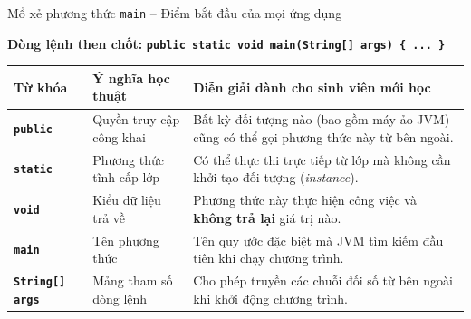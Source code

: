 \documentclass[aspectratio=169, 10pt]{beamer}
\begin{document}
\begin{frame}{Mổ xẻ phương thức \texttt{main} -- Điểm bắt đầu của mọi ứng dụng}
  \begin{block}{\textbf{Dòng lệnh then chốt:}}
    \centering
    \large\texttt{\textbf{\textcolor{JavaKeyword}{public static void} main(\textcolor{UniBlue}{String}[] args) \{ ... \}}}
  \end{block}

  \vspace{2mm}
  \begin{tabularx}{\textwidth}{l p{3.2cm} X}
    \toprule
    \textbf{Từ khóa} & \textbf{Ý nghĩa học thuật} & \textbf{Diễn giải dành cho sinh viên mới học} \\
    \midrule
    \texttt{\textbf{public}} & Quyền truy cập công khai & Bất kỳ đối tượng nào (bao gồm máy ảo JVM) cũng có thể gọi phương thức này từ bên ngoài. \\
    \texttt{\textbf{static}} & Phương thức tĩnh cấp lớp & Có thể thực thi trực tiếp từ lớp mà không cần khởi tạo đối tượng (\textit{instance}). \\
    \texttt{\textbf{void}} & Kiểu dữ liệu trả về & Phương thức này thực hiện công việc và \textbf{không trả lại} giá trị nào. \\
    \texttt{\textbf{main}} & Tên phương thức & Tên quy ước đặc biệt mà JVM tìm kiếm đầu tiên khi chạy chương trình. \\
    \texttt{\textbf{String[] args}} & Mảng tham số dòng lệnh & Cho phép truyền các chuỗi đối số từ bên ngoài khi khởi động chương trình. \\
    \bottomrule
  \end{tabularx}
\end{frame}
\end{document}
